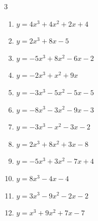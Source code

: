 \begin{multicols}{3}
\begin{enumerate}
  \item $y=4x^{3}+4x^{2}+2x+4$


  \item $y=2x^{3}+8x-5$


  \item $y=-5x^{3}+8x^{2}-6x-2$


  \item $y=-2x^{3}+x^{2}+9x$


\columnbreak %

\resetques

  \item $y=-3x^{3}-5x^{2}-5x-5$


  \item $y=-8x^{3}-3x^{2}-9x-3$


  \item $y=-3x^{3}-x^{2}-3x-2$


  \item $y=2x^{3}+8x^{2}+3x-8$


  \item $y=-5x^{3}+3x^{2}-7x+4$


  \item $y=8x^{3}-4x-4$


  \item $y=3x^{3}-9x^{2}-2x-2$


  \item $y=x^{3}+9x^{2}+7x-7$



\end{enumerate}
\end{multicols}
